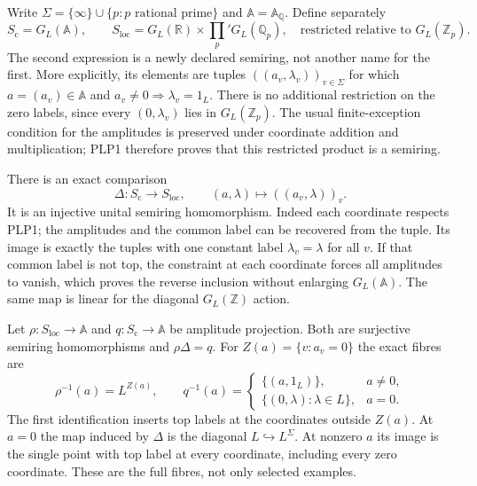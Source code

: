 Write $\Sigma=\{\infty\}\cup\{p:p\text{ rational prime}\}$ and
$\mathbb A=\mathbb A_{\mathbb Q}$. Define separately
\begin{equation}\tag{PLP2}
S_{\mathrm c}=G_L(\mathbb A),\qquad
S_{\mathrm{loc}}=
G_L(\mathbb R)\times\prod_p' G_L(\mathbb Q_p),
\quad\text{restricted relative to }G_L(\mathbb Z_p).
\end{equation}
The second expression is a newly declared semiring, not another name
for the first. More explicitly, its elements are tuples
$((a_v,\lambda_v))_{v\in\Sigma}$ for which $a=(a_v)\in\mathbb A$
and $a_v\ne0\Rightarrow\lambda_v=1_L$. There is no additional
restriction on the zero labels, since every $(0,\lambda_v)$ lies in
$G_L(\mathbb Z_p)$. The usual finite-exception condition for the
amplitudes is preserved under coordinate addition and multiplication;
PLP1 therefore proves that this restricted product is a semiring.

There is an exact comparison
\begin{equation}\tag{PLP3}
\Delta:S_{\mathrm c}\longrightarrow S_{\mathrm{loc}},
\qquad (a,\lambda)\longmapsto((a_v,\lambda))_v.
\end{equation}
It is an injective unital semiring homomorphism. Indeed each coordinate
respects PLP1; the amplitudes and the common label can be recovered from
the tuple. Its image is exactly the tuples with one constant label
$\lambda_v=\lambda$ for all $v$. If that common label is not top, the
constraint at each coordinate forces all amplitudes to vanish, which
proves the reverse inclusion without enlarging $G_L(\mathbb A)$.
The same map is linear for the diagonal $G_L(\mathbb Z)$ action.

Let $\rho:S_{\mathrm{loc}}\to\mathbb A$ and
$q:S_{\mathrm c}\to\mathbb A$ be amplitude projection. Both are
surjective semiring homomorphisms and $\rho\Delta=q$. For
$Z(a)=\{v:a_v=0\}$ the exact fibres are
\begin{equation}\tag{PLP4}
\rho^{-1}(a)=L^{Z(a)},\qquad
q^{-1}(a)=
\begin{cases}
\{(a,1_L)\},&a\ne0,\\
\{(0,\lambda):\lambda\in L\},&a=0.
\end{cases}
\end{equation}
The first identification inserts top labels at the coordinates outside
$Z(a)$. At $a=0$ the map induced by $\Delta$ is the diagonal
$L\hookrightarrow L^\Sigma$. At nonzero $a$ its image is the single
point with top label at every coordinate, including every zero
coordinate. These are the full fibres, not only selected examples.

